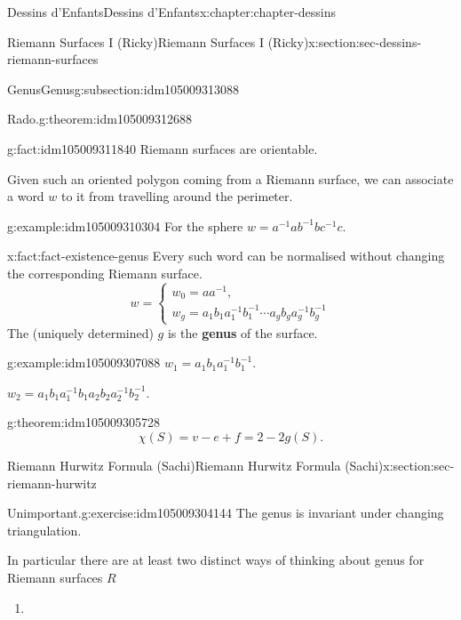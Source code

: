 \documentclass[oneside,10pt,]{book}
\newcommand{\terminology}[1]{\textbf{#1}}
\numberwithin{equation}{section}
\newcommand{\inv}{^{-1}}
\begin{document}
\begin{chapterptx}{Dessins d'Enfants}{}{Dessins d'Enfants}{}{}{x:chapter:chapter-dessins}
\begin{sectionptx}{Riemann Surfaces I (Ricky)}{}{Riemann Surfaces I (Ricky)}{}{}{x:section:sec-dessins-riemann-surfaces}
\begin{subsectionptx}{Genus}{}{Genus}{}{}{g:subsection:idm105009313088}
\begin{theorem}{Rado.}{}{g:theorem:idm105009312688}
\end{theorem}
\begin{fact}{}{}{g:fact:idm105009311840}%
Riemann surfaces are orientable.%
\end{fact}
Given such an oriented polygon coming from a Riemann surface, we can associate a word \(w\) to it from travelling around the perimeter.%
\begin{example}{}{g:example:idm105009310304}%
For the sphere \(w = a\inv ab\inv bc\inv c\).%
\end{example}
\begin{fact}{}{}{x:fact:fact-existence-genus}%
Every such word can be normalised without changing the corresponding Riemann surface.%
\begin{equation*}
w = \begin{cases} w_0 = aa\inv,\\ w_g = a_1b_1 a_1\inv b_1\inv \cdots a_gb_g a_g\inv b_g\inv\end{cases}
\end{equation*}
The (uniquely determined) \(g\) is the \terminology{genus} of the surface.%
\end{fact}
\begin{example}{}{g:example:idm105009307088}%
\(w_1 = a_1b_1 a_1\inv b_1 \inv\).%
\par
\(w_2 = a_1b_1 a_1\inv b_1a_2b_2 a_2\inv b_2 \inv\).%
\end{example}
\begin{theorem}{}{}{g:theorem:idm105009305728}%
%
\begin{equation*}
\chi (S) = v- e + f = 2-2g(S)\text{.}
\end{equation*}
%
\end{theorem}
\end{subsectionptx}
\end{sectionptx}
%
%
\typeout{************************************************}
\typeout{************************************************}
%
\begin{sectionptx}{Riemann Hurwitz Formula (Sachi)}{}{Riemann Hurwitz Formula (Sachi)}{}{}{x:section:sec-riemann-hurwitz}
\begin{inlineexercise}{Unimportant.}{g:exercise:idm105009304144}%
The genus is invariant under changing triangulation.%
\end{inlineexercise}
In particular there are at least two distinct ways of thinking about genus for Riemann surfaces \(R\)%
\begin{enumerate}
\item{}%

\end{enumerate}
\end{sectionptx}
\end{chapterptx}
\end{document}
